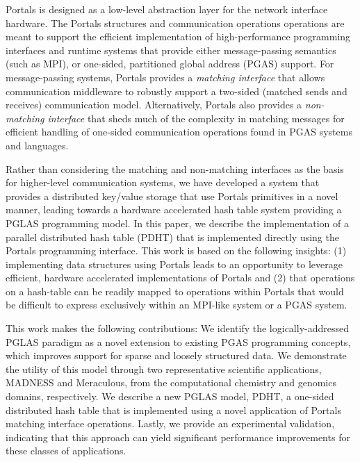 Portals is designed as a low-level abstraction layer for the network interface
hardware. The Portals structures and communication operations operations are
meant to support the efficient implementation of high-performance programming
interfaces and runtime systems that provide either message-passing semantics
(such as MPI), or one-sided, partitioned global address (PGAS) support. For
message-passing systems, Portals provides a {\em matching interface} that
allows communication middleware to robustly support a two-sided (matched sends
and receives) communication model. Alternatively, Portals also provides a {\em
non-matching interface} that sheds much of the complexity in matching messages
for efficient handling of one-sided communication operations found in PGAS
systems and languages.

Rather than considering the matching and non-matching interfaces as
the basis for higher-level communication systems, we have developed a
system that provides a distributed key/value storage that use Portals
primitives in a novel manner, leading towards a hardware accelerated
hash table system providing a PGLAS programming model. In this paper, we describe the implementation of a
parallel distributed hash table (PDHT) that is implemented directly
using the Portals programming interface. This work is based on the
following insights: (1) implementing data structures using Portals
leads to an opportunity to leverage efficient, hardware accelerated
implementations of Portals and (2) that operations on a hash-table
can be readily mapped to operations within
Portals that would be difficult to express exclusively within an
MPI-like system or a PGAS system.

This work makes the following contributions: We identify the
logically-addressed PGLAS paradigm as a novel extension to existing PGAS
programming concepts, which improves support for sparse and loosely structured
data.  We demonstrate the utility of this model through two representative
scientific applications, MADNESS and Meraculous, from the computational
chemistry and genomics domains, respectively.  We describe a new PGLAS model,
PDHT, a one-sided distributed hash table that is implemented using a novel
application of Portals matching interface operations. Lastly, we provide an
experimental validation, indicating that this approach can yield significant
performance improvements for these classes of applications.




